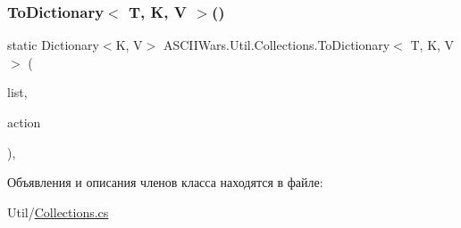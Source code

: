 \subsubsection{\texorpdfstring{To\+Dictionary$<$ T, K, V $>$()}{ToDictionary< T, K, V >()}}
{\footnotesize\ttfamily static Dictionary$<$K, V$>$ A\+S\+C\+I\+I\+Wars.\+Util.\+Collections.\+To\+Dictionary$<$ T, K, V $>$ (\begin{DoxyParamCaption}\item[{this List$<$ T $>$}]{list,  }\item[{Func$<$ T, Key\+Value\+Pair$<$ K, V $>$$>$}]{action }\end{DoxyParamCaption})\hspace{0.3cm}{\ttfamily [inline]}, {\ttfamily [static]}}



Объявления и описания членов класса находятся в файле\+:\begin{DoxyCompactItemize}
\item 
Util/\hyperlink{_collections_8cs}{Collections.\+cs}\end{DoxyCompactItemize}
